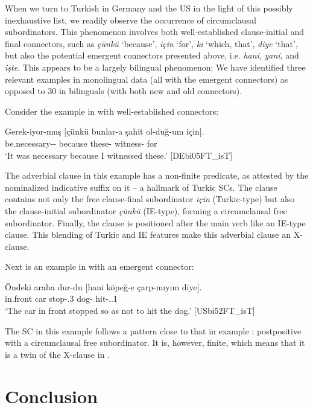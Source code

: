 \documentclass[output=paper,colorlinks,citecolor=brown]{langscibook}
\begin{document}
When we turn to Turkish in Germany and the US in the light of this possibly inexhaustive list, we readily observe the occurrence of circumclausal subordinators. This phenomenon involves both well-established clause-initial and final connectors, such as \textit{çünkü} ‘because’, \textit{için} ‘for’, \textit{ki} ‘which, that’, \textit{diye} ‘that’, but also the potential emergent connectors presented above, i.e. \textit{hani}, \textit{yani}, and \textit{işte}. This appears to be a largely bilingual phenomenon: We have identified three relevant examples in monolingual data (all with the emergent connectors) as opposed to 30 in bilinguals (with both new and old connectors).

Consider the example in  with well-established connectors:

\ea \label{ex:keskin:circum_cunku}
\gll Gerek-iyor-muş	$[$çünkü	bunlar-a	{şahit ol}-duğ-um	için$]$.\\
	be.necessary-\Prog-\Evid{}	\hphantom{[}because	these-\Dat{}	witness-\Sg{}	for\\
\glt ‘It was necessary because I witnessed these.’ [DEbi05FT\_isT]
\z

\noindent
The adverbial clause in this example has a non-finite predicate, as attested by the nominalized indicative suffix on it -- a hallmark of Turkic SCs. The clause contains not only the free clause-final subordinator \textit{için} (Turkic-type) but also the clause-initial subordinator \textit{çünkü} (IE-type), forming a circumclausal free subordinator. Finally, the clause is positioned after the main verb like an IE-type clause. This blending of Turkic and IE features make this adverbial clause an X-clause.

Next is an example in  with an emergent connector:

\ea \label{ex:keskin:circum_hani}
\gll Öndeki	araba	dur-du	$[$hani	köpeğ-e	çarp-mıyım	diye$]$.\\
	in.front car stop-\Pst.3\Sg{}  \hphantom{[}\Conn{} dog-\Dat{} hit-\Neg.\Opt.1\Sg{} \Conn{}\\
\glt ‘The car in front stopped so as not to hit the dog.’ [USbi52FT\_isT]
\z

\noindent
The SC in this example follows a pattern close to that in example : postpositive with a circumclausal free subordinator. It is, however, finite, which means that it is a twin of the X-clause in .

\section{Conclusion} 
\label{sec:keskin:conc}
\end{document}
